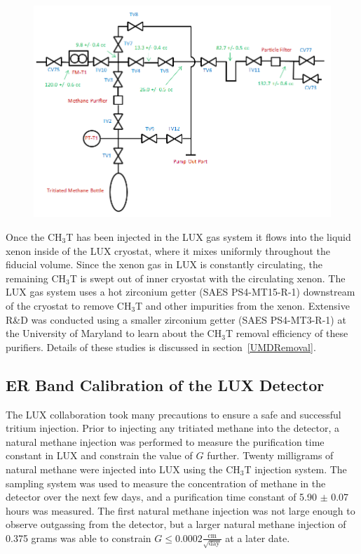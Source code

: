 \begin{figure} [!h]
\includegraphics[scale=.6]{TritiumPlumbing.png} 
\label{LUXInjectionSys}
\end{figure}

Once the CH$_3$T has been injected in the LUX gas system it flows into the liquid xenon inside of the LUX cryostat, where it mixes uniformly throughout the fiducial volume.  Since the xenon gas in LUX is constantly circulating, the remaining CH$_3$T is swept out of inner cryostat with the circulating xenon.  The LUX gas system uses a hot zirconium getter (SAES PS4-MT15-R-1) downstream of the cryostat to remove CH$_3$T and other impurities from the xenon. Extensive R\&D was conducted using a smaller zirconium getter (SAES PS4-MT3-R-1) at the University of Maryland to learn about the CH$_3$T removal efficiency of these purifiers. Details of these studies is discussed in section~\ref{UMDRemoval}.


\subsection{ER Band Calibration of the LUX Detector} \label{DiscrimSec}

The LUX collaboration took many precautions to ensure a safe and successful tritium injection. Prior to injecting any tritiated methane into the detector, a natural methane injection was performed to measure the purification time constant in LUX and constrain the value of $G$ further.   Twenty milligrams of natural methane were injected into LUX using the CH$_3$T injection system. The sampling system was used to measure the concentration of methane in the detector over the next few days, and a purification time constant of 5.90 $\pm$ 0.07 hours was measured.  The first natural methane injection was not large enough to observe outgassing from the detector, but a larger natural methane injection of 0.375 grams was able to constrain $G \le 0.0002 \frac{\text{cm}}{\sqrt{\text{day}}}$ at a later date.


